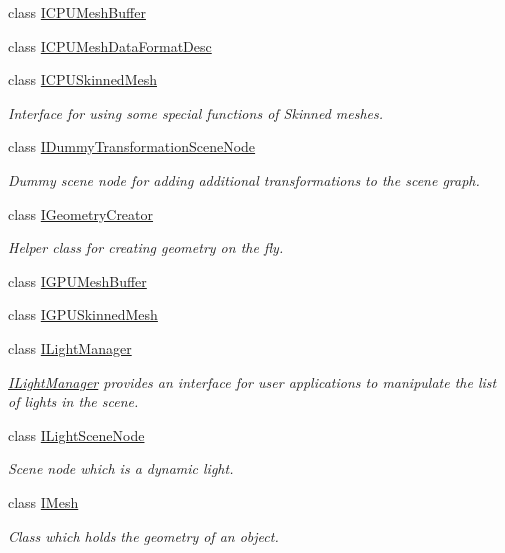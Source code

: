 \begin{DoxyCompactItemize}
class \hyperlink{classirr_1_1scene_1_1ICPUMeshBuffer}{I\+C\+P\+U\+Mesh\+Buffer}
\item 
class \hyperlink{classirr_1_1scene_1_1ICPUMeshDataFormatDesc}{I\+C\+P\+U\+Mesh\+Data\+Format\+Desc}
\item 
class \hyperlink{classirr_1_1scene_1_1ICPUSkinnedMesh}{I\+C\+P\+U\+Skinned\+Mesh}
\begin{DoxyCompactList}\small\item\em Interface for using some special functions of Skinned meshes. \end{DoxyCompactList}\item 
class \hyperlink{classirr_1_1scene_1_1IDummyTransformationSceneNode}{I\+Dummy\+Transformation\+Scene\+Node}
\begin{DoxyCompactList}\small\item\em Dummy scene node for adding additional transformations to the scene graph. \end{DoxyCompactList}\item 
class \hyperlink{classirr_1_1scene_1_1IGeometryCreator}{I\+Geometry\+Creator}
\begin{DoxyCompactList}\small\item\em Helper class for creating geometry on the fly. \end{DoxyCompactList}\item 
class \hyperlink{classirr_1_1scene_1_1IGPUMeshBuffer}{I\+G\+P\+U\+Mesh\+Buffer}
\item 
class \hyperlink{classirr_1_1scene_1_1IGPUSkinnedMesh}{I\+G\+P\+U\+Skinned\+Mesh}
\item 
class \hyperlink{classirr_1_1scene_1_1ILightManager}{I\+Light\+Manager}
\begin{DoxyCompactList}\small\item\em \hyperlink{classirr_1_1scene_1_1ILightManager}{I\+Light\+Manager} provides an interface for user applications to manipulate the list of lights in the scene. \end{DoxyCompactList}\item 
class \hyperlink{classirr_1_1scene_1_1ILightSceneNode}{I\+Light\+Scene\+Node}
\begin{DoxyCompactList}\small\item\em Scene node which is a dynamic light. \end{DoxyCompactList}\item 
class \hyperlink{classirr_1_1scene_1_1IMesh}{I\+Mesh}
\begin{DoxyCompactList}\small\item\em Class which holds the geometry of an object. \end{DoxyCompactList}\item 

\end{DoxyCompactItemize}
